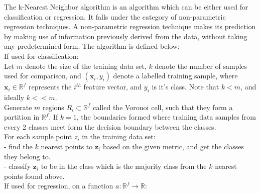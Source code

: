                                             The k-Nearest Neighbor algorithm is an algorithm which can be either used for classification or 
                                            regression. It falls under the category of non-parametric regression
                                            techniques. A non-parametric regression technique makes 
                                            its prediction by making use of information 
                                            previously derived from the data, without taking any predetermined form. \cite{sdasd}
                                            The algorithm is defined below;
                                            \\ \vspace{5mm}
                                            If used for classification:
                                            \\
                                            Let $m$ denote the size of the training data set, $k$ denote the number of samples used for comparison, and $(\bm{x}_i, y_i)$ denote a labelled training sample, where $\bm{x}_i \in \mathbb{R}^f$ represents the $i^{th}$ feature vector, and $y_i$ is it's class. Note that $k < m$, and ideally $k << m$.
                                            \\
                                            Generate $m$ regions $R_i \subset \mathbb{R}^f$ called the Voronoi cell, such that they form a partition in $\mathbb{R}^f$. If $k=1$, the boundaries formed where training data samples from every 2 classes meet form the decision boundary between the classes.
                                            \\
                                            For each sample point $z_{i}$ in the training data set:
                                            \\
                                            \tab- find the $k$ nearest points to $\bm{z}_i$ based on the given metric, and get the classes they belong to. 
                                            \\
                                            \tab- classify $\bm{z}_i$ to be in the class which is the majority class from the $k$ nearest points found above.
                                            \\ \vspace{5mm}
                                            If used for regression, on a function $a: \mathbb{R}^f \to \mathbb{R}$:
